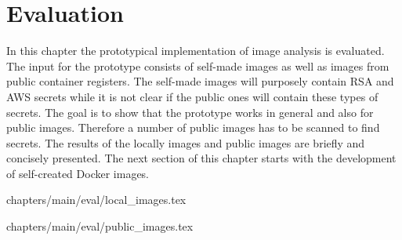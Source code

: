 \chapter{Evaluation}
\label{ch:eval}
In this chapter the prototypical implementation of image analysis is evaluated. 
The input for the prototype consists of self-made images as well as images from public container registers. 
The self-made images will purposely contain RSA and AWS secrets while it is not clear if the public ones will contain these types of secrets. 
The goal is to show that the prototype works in general and also for public images.
Therefore a number of public images has to be scanned to find secrets.
The results of the locally images and public images are briefly and concisely presented.
The next section of this chapter starts with the development of self-created Docker images.

 {chapters/main/eval/local_images.tex}

 {chapters/main/eval/public_images.tex}